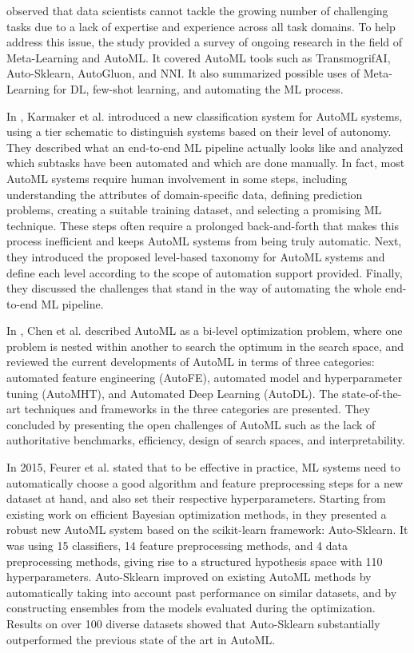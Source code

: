 \cite{9579526} observed that data scientists cannot tackle the growing number of challenging tasks due to a lack of expertise and experience across all task domains.
To help address this issue, the study provided a survey of ongoing research in the field of Meta-Learning and AutoML.
It covered AutoML tools such as TransmogrifAI, Auto-Sklearn, AutoGluon, and NNI.
It also summarized possible uses of Meta-Learning for DL, few-shot learning, and automating the ML process.

In \cite{Karmaker2021}, Karmaker et al. introduced a new classification system for AutoML systems, using a tier schematic to distinguish systems based on their level of autonomy.
They described what an end-to-end ML pipeline actually looks like and analyzed which subtasks have been automated and which are done manually.
In fact, most AutoML systems require human involvement in some steps, including understanding the attributes of domain-specific data, defining prediction problems, creating a suitable training dataset, and selecting a promising ML technique.
These steps often require a prolonged back-and-forth that makes this process inefficient and keeps AutoML systems from being truly automatic.
Next, they introduced the proposed level-based taxonomy for AutoML systems and define each level according to the scope of automation support provided.
Finally, they discussed the challenges that stand in the way of automating the whole end-to-end ML pipeline.

In \cite{Chen2021}, Chen et al. described AutoML as a bi-level optimization problem, where one problem is nested within another to search the optimum in the search space, and reviewed the current developments of AutoML in terms of three categories:
automated feature engineering (AutoFE),
automated model and hyperparameter tuning (AutoMHT),
and Automated Deep Learning (AutoDL).
The state-of-the-art techniques and frameworks in the three categories are presented.
They concluded by presenting the open challenges of AutoML such as the lack of authoritative benchmarks, efficiency, design of search spaces, and interpretability.

In 2015, Feurer et al. stated that to be effective in practice, ML systems need to automatically choose a good algorithm and feature preprocessing steps for a new dataset at hand, and also set their respective hyperparameters.
Starting from existing work on efficient Bayesian optimization methods, in \cite{Feurer2015} they presented a robust new AutoML system based on the scikit-learn framework: Auto-Sklearn.
It was using 15 classifiers, 14 feature preprocessing methods, and 4 data preprocessing methods, giving rise to a structured hypothesis space with 110 hyperparameters.
Auto-Sklearn improved on existing AutoML methods by automatically taking into account past performance on similar datasets, and by constructing ensembles from the models evaluated during the optimization.
Results on over 100 diverse datasets showed that Auto-Sklearn substantially outperformed the previous state of the art in AutoML.

